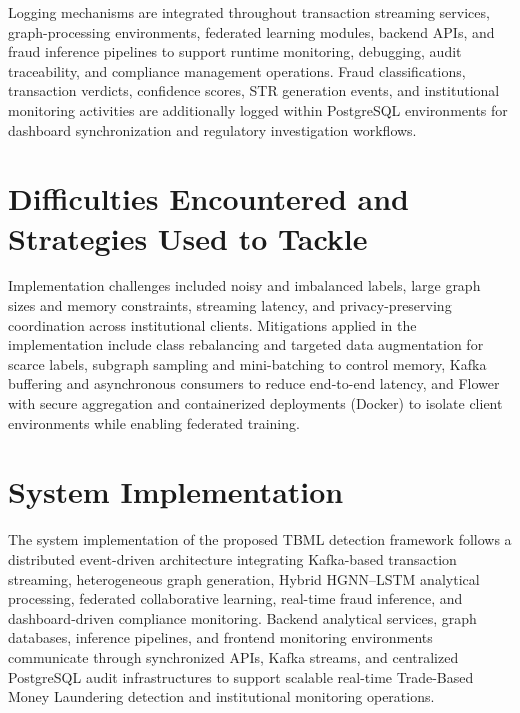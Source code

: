 Logging mechanisms are integrated throughout transaction streaming services, graph-processing environments, federated learning modules, backend APIs, and fraud inference pipelines to support runtime monitoring, debugging, audit traceability, and compliance management operations. Fraud classifications, transaction verdicts, confidence scores, STR generation events, and institutional monitoring activities are additionally logged within PostgreSQL environments for dashboard synchronization and regulatory investigation workflows.

\section[Difficulties Encountered and Strategies Used]{\textbf{Difficulties Encountered and Strategies Used to Tackle}}
Implementation challenges included noisy and imbalanced labels, large graph sizes and memory constraints, streaming latency, and privacy-preserving coordination across institutional clients. Mitigations applied in the implementation include class rebalancing and targeted data augmentation for scarce labels, subgraph sampling and mini-batching to control memory, Kafka buffering and asynchronous consumers to reduce end-to-end latency, and Flower with secure aggregation and containerized deployments (Docker) to isolate client environments while enabling federated training.


\section[System Implementation]{\textbf{System Implementation}}


The system implementation of the proposed TBML detection framework follows a distributed event-driven architecture integrating Kafka-based transaction streaming, heterogeneous graph generation, Hybrid HGNN--LSTM analytical processing, federated collaborative learning, real-time fraud inference, and dashboard-driven compliance monitoring. Backend analytical services, graph databases, inference pipelines, and frontend monitoring environments communicate through synchronized APIs, Kafka streams, and centralized PostgreSQL audit infrastructures to support scalable real-time Trade-Based Money Laundering detection and institutional monitoring operations.

